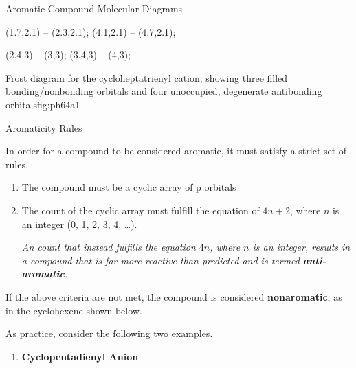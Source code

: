 \begin{core}{Aromatic Compound Molecular Diagrams}
\begin{enumerate}
{\begin{scope}[xshift=5cm]
             (1.7,2.1) -- (2.3,2.1);
             (4.1,2.1) -- (4.7,2.1);

             (2.4,3) -- (3,3);
             (3.4,3) -- (4,3);
          \end{scope}
        }{Frost diagram for the cycloheptatrienyl cation, showing three filled bonding/nonbonding orbitals and four unoccupied, degenerate antibonding orbitals}{fig:ph64a}{1}

      \end{enumerate}

    \end{core}

    \begin{core}[label=core:aromaticity_rules]{Aromaticity Rules}

      In order for a compound to be considered aromatic, it must satisfy a strict set of rules.

      \begin{enumerate}[label=(\arabic*)]

        \item The compound must be a cyclic array of p orbitals

        \item The  count of the cyclic array must fulfill the equation of $4n+2$, where $n$ is an integer (0, 1, 2, 3, 4, \ldots).

        \textit{An  count that instead fulfills the equation $4n$, where $n$ is an integer, results in a compound that is far more reactive than predicted and is termed \textbf{anti-aromatic}.}

      \end{enumerate}

      If the above criteria are not met, the compound is considered \textbf{nonaromatic}, as in the cyclohexene shown below.


      As practice, consider the following two examples.

      \begin{enumerate}

        \item \textbf{Cyclopentadienyl Anion}


\end{enumerate}
\end{core}
